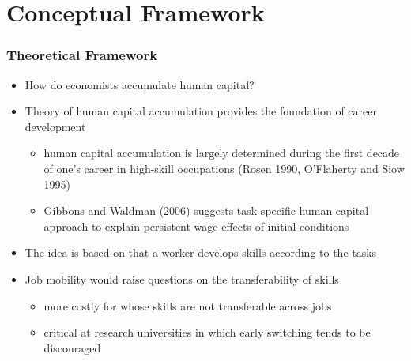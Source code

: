 \documentclass[10pt,svgnames,fragile]{beamer}
\begin{document}
{
	\AtBeginSection{}
\section{Conceptual Framework}

\begin{frame}
	\frametitle{Theoretical Framework}
	\begin{itemize}
		\item How do economists accumulate human capital?
\vfill
		\item Theory of human capital accumulation provides the foundation of career development
		\begin{itemize}
			\item human capital accumulation is largely determined during the first decade of one's career in high-skill occupations {\small (Rosen 1990, O'Flaherty and Siow 1995)} 
				\vspace{1 mm}
			\item Gibbons and Waldman (2006) suggests task-specific human capital approach to explain persistent wage effects of initial conditions 
		\end{itemize}
\vfill
		\item The idea is based on that a worker develops skills according to the tasks
\vfill
		\item Job mobility would raise  questions on the transferability of skills 
		\begin{itemize}
			\vspace{1 mm}
			\item more costly for  whose skills are not transferable across jobs
			\vspace{1 mm}
			\item critical at research universities in which early switching tends to be discouraged 						
		\end{itemize}
\vfill
	\end{itemize}
\end{frame}






}
\end{document}
